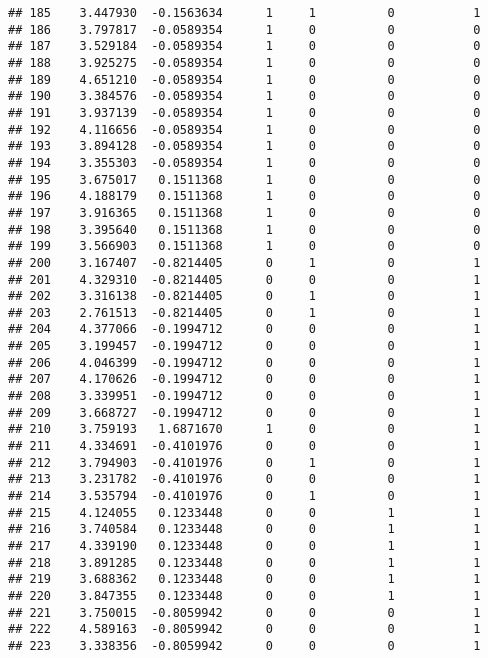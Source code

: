 \documentclass[
]{article}
\begin{document}
\begin{verbatim}
## 185    3.447930  -0.1563634      1     1          0           1
## 186    3.797817  -0.0589354      1     0          0           0
## 187    3.529184  -0.0589354      1     0          0           0
## 188    3.925275  -0.0589354      1     0          0           0
## 189    4.651210  -0.0589354      1     0          0           0
## 190    3.384576  -0.0589354      1     0          0           0
## 191    3.937139  -0.0589354      1     0          0           0
## 192    4.116656  -0.0589354      1     0          0           0
## 193    3.894128  -0.0589354      1     0          0           0
## 194    3.355303  -0.0589354      1     0          0           0
## 195    3.675017   0.1511368      1     0          0           0
## 196    4.188179   0.1511368      1     0          0           0
## 197    3.916365   0.1511368      1     0          0           0
## 198    3.395640   0.1511368      1     0          0           0
## 199    3.566903   0.1511368      1     0          0           0
## 200    3.167407  -0.8214405      0     1          0           1
## 201    4.329310  -0.8214405      0     0          0           1
## 202    3.316138  -0.8214405      0     1          0           1
## 203    2.761513  -0.8214405      0     1          0           1
## 204    4.377066  -0.1994712      0     0          0           1
## 205    3.199457  -0.1994712      0     0          0           1
## 206    4.046399  -0.1994712      0     0          0           1
## 207    4.170626  -0.1994712      0     0          0           1
## 208    3.339951  -0.1994712      0     0          0           1
## 209    3.668727  -0.1994712      0     0          0           1
## 210    3.759193   1.6871670      1     0          0           1
## 211    4.334691  -0.4101976      0     0          0           1
## 212    3.794903  -0.4101976      0     1          0           1
## 213    3.231782  -0.4101976      0     0          0           1
## 214    3.535794  -0.4101976      0     1          0           1
## 215    4.124055   0.1233448      0     0          1           1
## 216    3.740584   0.1233448      0     0          1           1
## 217    4.339190   0.1233448      0     0          1           1
## 218    3.891285   0.1233448      0     0          1           1
## 219    3.688362   0.1233448      0     0          1           1
## 220    3.847355   0.1233448      0     0          1           1
## 221    3.750015  -0.8059942      0     0          0           1
## 222    4.589163  -0.8059942      0     0          0           1
## 223    3.338356  -0.8059942      0     0          0           1

\end{verbatim}
\end{document}

